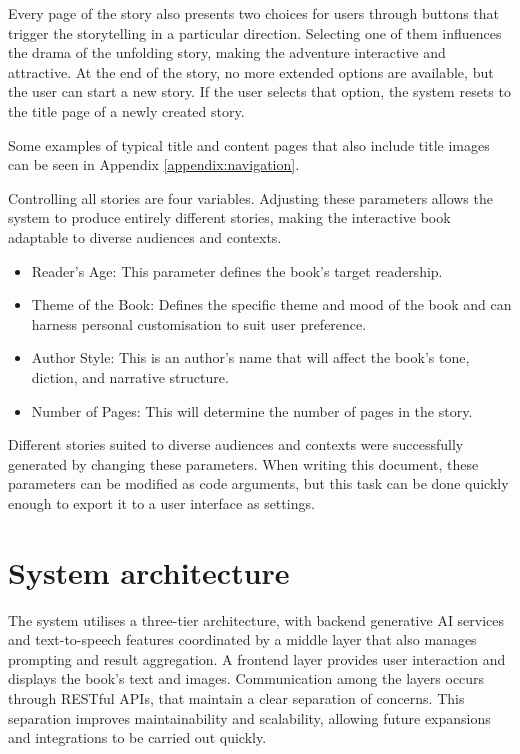 \documentclass[conference]{IEEEtran}
\begin{document}
	Every page of the story also presents two choices for users through buttons that trigger the storytelling in a particular direction. Selecting one of them influences the drama of the unfolding story, making the adventure interactive and attractive. At the end of the story, no more extended options are available, but the user can start a new story. If the user selects that option, the system resets to the title page of a newly created story.
	
	Some examples of typical title and content pages that also include title images can be seen in Appendix \ref{appendix:navigation}.
	
	Controlling all stories are four variables. Adjusting these parameters allows the system to produce entirely different stories, making the interactive book adaptable to diverse audiences and contexts. 
	
	\begin{itemize}[]
		\item Reader's Age: This parameter defines the book's target readership.
		\item Theme of the Book: Defines the specific theme and mood of the book and can harness personal customisation to suit user preference.
		\item Author Style: This is an author's name that will affect the book's tone, diction, and narrative structure.
		\item Number of Pages: This will determine the number of pages in the story.
	\end{itemize}
	
	Different stories suited to diverse audiences and contexts were successfully generated by changing these parameters. When writing this document, these parameters can be modified as code arguments, but this task can be done quickly enough to export it to a user interface as settings.
	
	
	\section {System architecture}
	
	The system utilises a three-tier architecture, with backend generative AI services and text-to-speech features coordinated by a middle layer that also manages prompting and result aggregation. A frontend layer provides user interaction and displays the book's text and images. Communication among the layers occurs through RESTful APIs, that maintain a clear separation of concerns. This separation improves maintainability and scalability, allowing future expansions and integrations to be carried out quickly.
	
\end{document}
